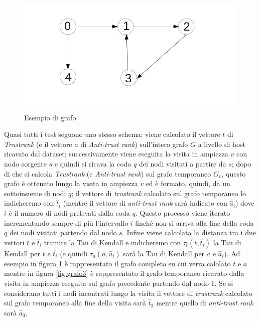 \begin{figure}
\centering
 \includegraphics{immagini/test/grafoComp}
 \caption{Esempio di grafo}
 \label{fig:grafoComp}
\end{figure}

Quasi tutti i test seguono uno stesso schema; viene calcolato il vettore \(t\) di  \textit{Trustrank} (e il vettore \(a\) di \textit{Anti-trust rank}) sull'intero grafo \(G\) a livello di host ricavato dal dataset; successivamente viene eseguita la visita in ampiezza \(v\) con nodo sorgente \(s\) e quindi si ricava la coda \(q\) dei nodi visitati a partire da \(s\); dopo di che si calcola  \textit{Trustrank} (e \textit{Anti-trust rank}) sul grafo temporaneo \(G_v\), questo grafo è ottenuto lungo la visita in ampiezza \(v\) ed è formato, quindi, da un sottoinsieme di nodi \(q\); il vettore di \textit{trustrank} calcolato sul grafo temporaneo lo indicheremo con \(\hat{t}_i\) (mentre il vettore di \textit{anti-trust rank} sarà indicato con \(\hat{a}_i\)) dove \(i\) è il numero di nodi prelevati dalla coda \(q\). Questo processo viene iterato incrementando sempre di più l'intervallo \(i\) finché non si arriva alla fine della coda \(q\) dei nodi visitati partendo dal nodo \(s\). Infine viene calcolata la distanza 
tra i due vettori \(t\) e \(\hat{t}_i\) tramite la Tau di Kendall e indicheremo con \(\tau_t(t,\hat{t}_i)\) la Tau di Kendall per \(t\) e \(\hat{t}_i\)  (e quindi \(\tau_a(a,\hat{a}_i)\) sarà la Tau di Kendall per \(a\) e \(\hat{a}_i\)). Ad esempio in figura \ref{fig:grafoComp} è rappresentato il grafo completo su cui verra calolato \(t\) e \(a\) mentre in figura \ref{fig:grafo3} è rappresentato il grafo temporaneo ricavato dalla visita in ampiezza eseguita sul grafo precedente partendo dal nodo 1. Se si considerano tutti i nodi incontrati lungo la visita il vettore di \textit{trustrank} calcolato sul grafo temporaneo alla fine della visita sarà \(\hat{t}_3\) mentre quello di \textit{anti-trust rank} sarà \(\hat{a}_3\).

